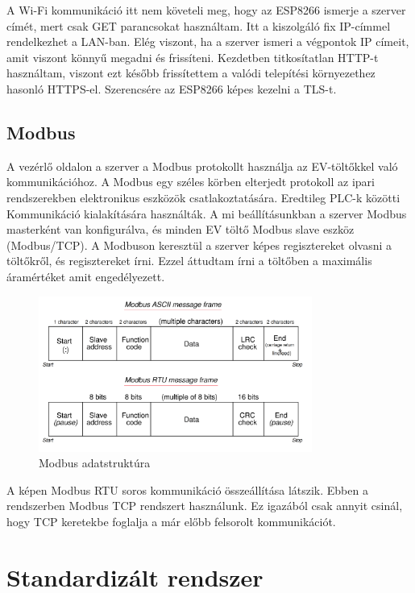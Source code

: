 A Wi-Fi kommunikáció itt nem követeli meg, hogy az ESP8266 ismerje a szerver címét, mert csak GET parancsokat
használtam. Itt a kiszolgáló fix IP-címmel rendelkezhet a LAN-ban. Elég viszont, ha a szerver ismeri a végpontok IP címeit,
amit viszont könnyű megadni és frissíteni.
Kezdetben titkosítatlan HTTP-t használtam, viszont ezt később frissítettem a valódi telepítési környezethez hasonló 
HTTPS-el. Szerencsére az ESP8266 képes kezelni a TLS-t.

\subsection{Modbus}

A vezérlő oldalon a szerver a Modbus protokollt használja az EV-töltőkkel való kommunikációhoz. 
A Modbus egy széles körben elterjedt protokoll az ipari rendszerekben elektronikus eszközök csatlakoztatására. 
Eredtileg PLC-k közötti Kommunikáció kialakítására használták.
A mi beállításunkban a szerver Modbus masterként van konfigurálva, 
és minden EV töltő Modbus slave eszköz (Modbus/TCP). A Modbuson keresztül a szerver képes regisztereket olvasni a 
töltőkről, és regisztereket írni. Ezzel áttudtam írni a töltőben a maximális áramértéket amit engedélyezett. 
\cite{mcuoneclipse:evcharger}

\begin{figure}[!ht]
    \centering
    \includegraphics[width=0.8\textwidth, keepaspectratio]{figures/Modbus_Frame.png}
    \caption{Modbus adatstruktúra \cite{instrumentationtools:modbus}} 
\end{figure}

A képen Modbus RTU soros kommunikáció összeállítása látszik. Ebben a rendszerben Modbus TCP rendszert használunk.
Ez igazából csak annyit csinál, hogy TCP keretekbe foglalja a már előbb felsorolt kommunikációt.

\section{Standardizált rendszer}

